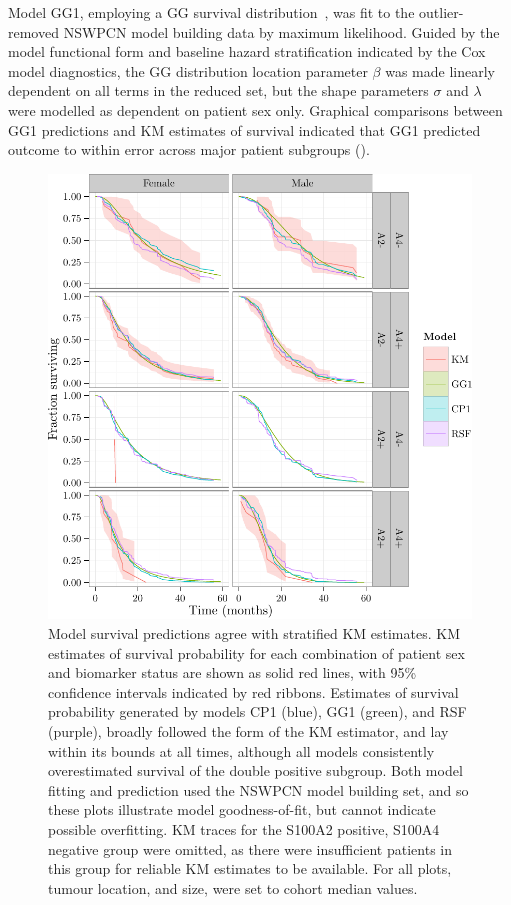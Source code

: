 \documentclass[dissertation.tex]{subfiles}
\begin{document}
Model GG1, employing a \gls{GG} survival distribution~\cite{Cox2007}, was fit to the outlier-removed \gls{NSWPCN} model building data by maximum likelihood.  Guided by the model functional form and baseline hazard stratification indicated by the Cox model diagnostics, the \gls{GG} distribution location parameter $\beta$ was made linearly dependent on all terms in the reduced set, but the shape parameters $\sigma$ and $\lambda$ were modelled as dependent on patient sex only.  Graphical comparisons between GG1 predictions and \gls{KM} estimates of survival indicated that GG1 predicted outcome to within error across major patient subgroups ().

\begin{figure}
\centering
  \includegraphics[width=.85\linewidth]{analysis/nomogram/figure/05-final-fit-assessment-2}
  \caption[Model survival predictions agree with stratified \texorpdfstring{\acrshort{KM}}{KM} estimates]{Model survival predictions agree with stratified \gls{KM} estimates.  \gls{KM} estimates of survival probability for each combination of patient sex and biomarker status are shown as solid red lines, with 95\% confidence intervals indicated by red ribbons.  Estimates of survival probability generated by models CP1 (blue), GG1 (green), and RSF (purple), broadly followed the form of the \gls{KM} estimator, and lay within its bounds at all times, although all models consistently overestimated survival of the double positive subgroup.  Both model fitting and prediction used the \gls{NSWPCN} model building set, and so these plots illustrate model goodness-of-fit, but cannot indicate possible overfitting.  \gls{KM} traces for the S100A2 positive, S100A4 negative group were omitted, as there were insufficient patients in this group for reliable \gls{KM} estimates to be available.  For all plots, tumour location, and size, were set to cohort median values.}
\label{fig:nomo-cp1-gg1-fitplot}
\end{figure}
\end{document}
